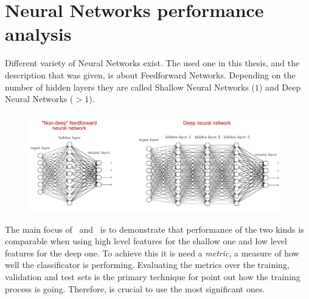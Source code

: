 \chapter{Neural Networks performance analysis}

Different variety of Neural Networks exist. The used one in this thesis,
and the description that was given, is about Feedforward Networks.
Depending on the number of hidden layers they are called Shallow Neural
Networks ($1$) and Deep Neural Networks ($>1$).
\begin{figure}[h]
 \centering
 \includegraphics[scale=0.4]{figures/svsd.jpeg}
\end{figure}

The main focus of~\cite{paper} and~\cite{gaia} is to demonstrate that
performance of the two kinds is comparable when using high level features
for the shallow one and low level features for the deep one. To achieve this
it is need a \textit{metric}, a measure of how well the classificator is
performing. Evaluating the metrics over the training, validation and test sets
is the primary technique for point out how the training process is going.
Therefore, is crucial to use the most significant ones.

